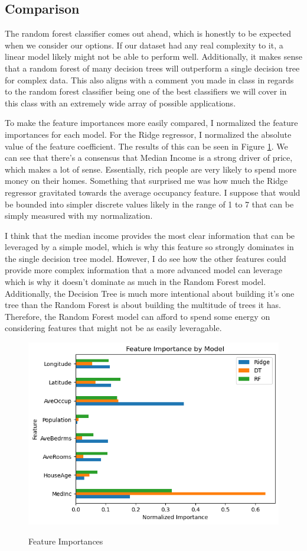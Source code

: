 \documentclass[12pt]{article}
\begin{document}
\subsection{Comparison}
The random forest classifier comes out ahead, which is honestly to be expected when we consider our options. If our dataset
had any real complexity to it, a linear model likely might not be able to perform well. Additionally, it makes sense that 
a random forest of many decision trees will outperform a single decision tree for complex data. This also aligns with a comment
you made in class in regards to the random forest classifier being one of the best classifiers we will cover in this class with 
an extremely wide array of possible applications.

To make the feature importances more easily compared, I normalized the feature importances for each model. For the Ridge
regressor, I normalized the absolute value of the feature coefficient. The results of this can be seen in Figure 
\ref{figure4}. We can see that there's a consensus that Median Income is a strong driver of price, which makes a lot 
of sense. Essentially, rich people are very likely to spend more money on their homes. Something that surprised me was 
how much the Ridge regressor gravitated towards the average occupancy feature. I suppose that would be bounded into 
simpler discrete values likely in the range of 1 to 7 that can be simply measured with my normalization.

I think that the median income provides the most clear information that can be leveraged by a simple model, which is why
this feature so strongly dominates in the single decision tree model. However, I do see how the other features could provide
more complex information that a more advanced model can leverage which is why it doesn't dominate as much in the Random 
Forest model. Additionally, the Decision Tree is much more intentional about building it's one tree than the Random Forest 
is about building the multitude of trees it has. Therefore, the Random Forest model can afford to spend some energy on 
considering features that might not be as easily leveragable.

\begin{figure}
  \includegraphics[width = .75\textwidth]{../results/Features.png}
  \label{figure4}
  \caption{Feature Importances}
\end{figure}
\end{document}
